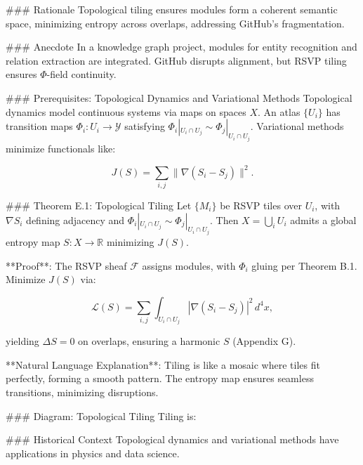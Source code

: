 \documentclass[12pt]{article}
\begin{document}
{### Rationale
Topological tiling ensures modules form a coherent semantic space, minimizing entropy across overlaps, addressing GitHub’s fragmentation.

### Anecdote
In a knowledge graph project, modules for entity recognition and relation extraction are integrated. GitHub disrupts alignment, but RSVP tiling ensures $\Phi$-field continuity.

### Prerequisites: Topological Dynamics and Variational Methods
Topological dynamics model continuous systems via maps on spaces $X$. An atlas $\{ U_i \}$ has transition maps $\Phi_i : U_i \to \mathcal{Y}$ satisfying $\Phi_i|_{U_i \cap U_j} \sim \Phi_j|_{U_i \cap U_j}$. Variational methods minimize functionals like:

\[
J(S) = \sum_{i,j} \|\nabla (S_i - S_j)\|^2.
\]

### Theorem E.1: Topological Tiling
Let $\{ M_i \}$ be RSVP tiles over $U_i$, with $\nabla S_i$ defining adjacency and $\Phi_i|_{U_i \cap U_j} \sim \Phi_j|_{U_i \cap U_j}$. Then $X = \bigcup_i U_i$ admits a global entropy map $S : X \to \mathbb{R}$ minimizing $J(S)$.

**Proof**: The RSVP sheaf $\mathcal{F}$ assigns modules, with $\Phi_i$ gluing per Theorem B.1. Minimize $J(S)$ via:

\[
\mathcal{L}(S) = \sum_{i,j} \int_{U_i \cap U_j} |\nabla (S_i - S_j)|^2 \, d^4x,
\]

yielding $\Delta S = 0$ on overlaps, ensuring a harmonic $S$ \cite{evans2010partial} (Appendix G).

**Natural Language Explanation**: Tiling is like a mosaic where tiles fit perfectly, forming a smooth pattern. The entropy map ensures seamless transitions, minimizing disruptions.

### Diagram: Topological Tiling
Tiling is:

\begin{center}
\end{center}

### Historical Context
Topological dynamics and variational methods have applications in physics and data science.

}
\end{document}
